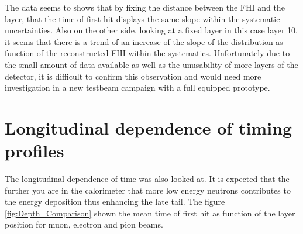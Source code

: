 The data seems to shows that by fixing the distance between the FHI and the layer, that the time of first hit displays the same slope within the systematic uncertainties. Also on the other side, looking at a fixed layer in this case layer 10, it seems that there is a trend of an increase of the slope of the distribution as function of the reconstructed FHI within the systematics. Unfortunately due to the small amount of data available as well as the unusability of more layers of the detector, it is difficult to confirm this observation and would need more investigation in a new testbeam campaign with a full equipped prototype.

\section{Longitudinal dependence of timing profiles}

The longitudinal dependence of time was also looked at. It is expected that the further you are in the calorimeter that more low energy neutrons contributes to the energy deposition thus enhancing the late tail. The figure \ref{fig:Depth_Comparison} shown the mean time of first hit as function of the layer position for muon, electron and pion beams.

